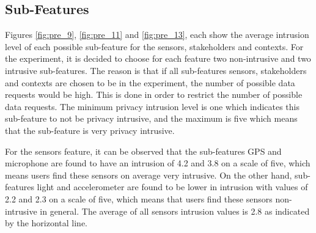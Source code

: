 \subsection{Sub-Features}

%
%


Figures \ref{fig:pre_9}, \ref{fig:pre_11} and \ref{fig:pre_13}, each show the average intrusion level of each possible sub-feature for
the sensors, stakeholders and contexts. For the experiment, it is decided to choose for each feature two non-intrusive and two intrusive sub-features. The reason is that if all sub-features sensors, stakeholders and contexts are chosen to be in the experiment, the number of possible data requests would be high. This is done in order to restrict the number of possible data requests. The minimum privacy intrusion level is one which indicates this sub-feature to not be privacy intrusive, and the maximum is five which means that the sub-feature is very privacy intrusive.

For the sensors feature, it can be observed that the sub-features GPS and microphone are found to have an intrusion of 4.2 and 3.8 on a scale of five, which means users find these sensors on average very intrusive. On the other hand, sub-features light and accelerometer are found to be lower in intrusion with values of 2.2 and 2.3 on a scale of five, which means that users find these sensors non-intrusive in general. The average of all sensors intrusion values is 2.8 as indicated by the horizontal line.

